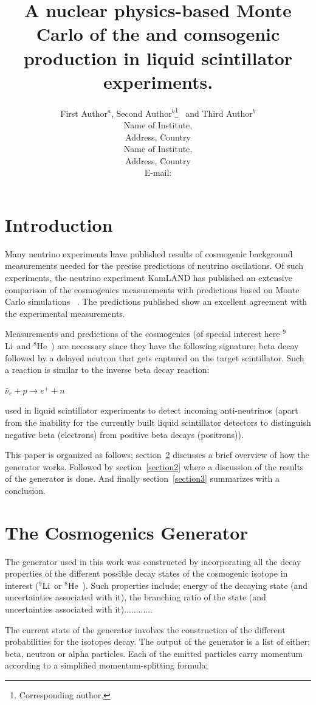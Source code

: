 \documentclass{JINST}
\title{A nuclear physics-based Monte Carlo of the \li  and \he  comsogenic production in liquid scintillator experiments.}
\author{First Author$^a$, Second Author$^b$\thanks{Corresponding
author.}~ and Third Author$^b$\\
\llap{$^a$}Name of Institute,\\
  Address, Country\\
\llap{$^b$}Name of Institute,\\
  Address, Country\\
  E-mail: \email{CorrespondingAuthor@email.com}}
\newcommand{\li}{$^{9}$Li~}
\newcommand{\he}{$^{8}$He~}
\begin{document}
\section{Introduction}


      Many neutrino experiments have published results of cosmogenic background measurements needed for
      the precise predictions of neutrino oscilations. Of such experiments, the neutrino experiment 
      KamLAND has published an extensive comparison of the cosmogenics measurements with 
      predictions based on Monte Carlo simulations ~\cite{PhysRevC.81.025807}. The predictions published show an excellent agreement
      with the experimental measurements.
     
     
     Measurements and predictions of the cosmogenics (of special interest here \li and \he) are necessary since they
      have the following signature; beta decay followed by a delayed neutron that gets captured on the 
      target scintillator. Such a reaction is similar to the inverse beta decay reaction:

      \mbox{$\bar{\nu}_e + p \rightarrow e^+ + n$}
      
      
      used in liquid scintillator experiments to detect incoming anti-neutrinos (apart from the inability for the 
      currently built liquid scintillator detectors to distinguish negative beta (electrons) from positive beta decays (positrons)).


      This paper is organized as follows; section~\ref{section1} discusses a brief overview of
      how the generator works. Followed by section~\ref{section2} where a discussion of the 
      results of the generator is done. And finally section~\ref{section3} summarizes with a conclusion.
      

\section{The Cosmogenics Generator}
\label{section1}

The generator used in this work was constructed by incorporating all the decay properties of 
the different possible decay states of the cosmogenic isotope in interest (\li or \he). Such properties include;
energy of the decaying state (and uncertainties associated with it),
the branching ratio of the state (and uncertainties associated with it)............

The current state of the generator involves the construction of the different 
 probabilities for the isotopes decay. The output of the generator is a list 
 of either; beta, neutron or alpha particles. Each of the emitted particles carry momentum 
 according to a simplified momentum-splitting formula;
 
\end{document}
